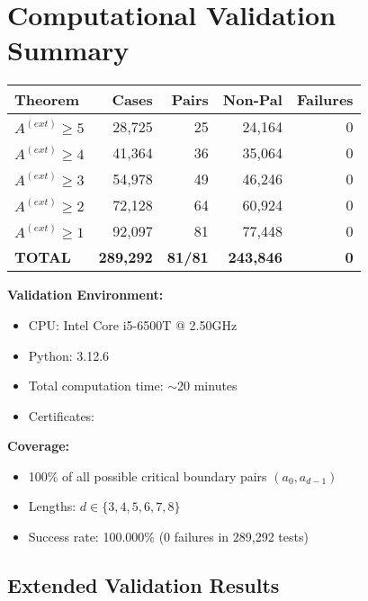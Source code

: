 \documentclass[12pt,a4paper]{article}
\begin{document}
\section*{Computational Validation Summary}

\begin{center}
\begin{tabular}{lrrrr}
\toprule
	\textbf{Theorem} & \textbf{Cases} & \textbf{Pairs} & \textbf{Non-Pal} & \textbf{Failures} \\
\midrule
$A^{(ext)} \geq 5$ & 28,725 & 25 & 24,164 & 0 \\
$A^{(ext)} \geq 4$ & 41,364 & 36 & 35,064 & 0 \\
$A^{(ext)} \geq 3$ & 54,978 & 49 & 46,246 & 0 \\
$A^{(ext)} \geq 2$ & 72,128 & 64 & 60,924 & 0 \\
$A^{(ext)} \geq 1$ & 92,097 & 81 & 77,448 & 0 \\
\midrule
	\textbf{TOTAL} & \textbf{289,292} & \textbf{81/81} & \textbf{243,846} & \textbf{0} \\
\bottomrule
\end{tabular}
\end{center}

\vspace{1em}

	\textbf{Validation Environment:}
\begin{itemize}
\item CPU: Intel Core i5-6500T @ 2.50GHz
\item Python: 3.12.6
\item Total computation time: $\sim$20 minutes
\item Certificates: \texttt{}
\end{itemize}

	\textbf{Coverage:}
\begin{itemize}
\item 100\% of all possible critical boundary pairs $(a_0, a_{d-1})$
\item Lengths: $d \in \{3, 4, 5, 6, 7, 8\}$
\item Success rate: 100.000\% (0 failures in 289,292 tests)
\end{itemize}

\subsection*{Extended Validation Results}
\end{document}
